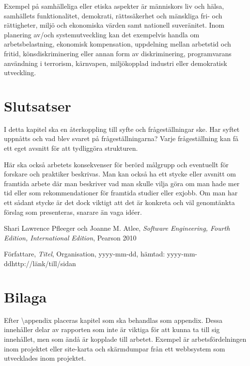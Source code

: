 \documentclass[a4paper,12pt,oneside,final]{extbook}
\begin{document}
Exempel på samhälleliga eller etiska aspekter är människors liv och
hälsa, samhällets funktionalitet, demokrati, rättssäkerhet och
mänskliga fri- och rättigheter, miljö och ekonomiska värden samt
nationell suveränitet. Inom planering av/och systemutveckling kan det
exempelvis handla om arbetsbelastning, ekonomisk kompensation,
uppdelning mellan arbetstid och fritid, könsdiskriminering eller annan
form av diskriminering, programvarans användning i terrorism,
kärnvapen, miljökopplad industri eller demokratisk utveckling.


\chapter{Slutsatser}

I detta kapitel ska en återkoppling till syfte och frågeställningar
ske. Har syftet uppnåtts och vad blev svaret på frågeställningarna?
Varje frågeställning kan få ett eget avsnitt för att tydliggöra
strukturen.

Här ska också arbetets konsekvenser för berörd målgrupp och eventuellt
för forskare och praktiker beskrivas. Man kan också ha ett stycke
eller avsnitt om framtida arbete där man beskriver vad man skulle
vilja göra om man hade mer tid eller som rekommendationer för framtida
studier eller exjobb. Om man har ett sådant stycke är det dock viktigt
att det är konkreta och väl genomtänkta förslag som presenteras,
snarare än vaga idéer.


\begin{thebibliography}{99}

  Shari Lawrence Pfleeger och Joanne M. Atlee, \emph{Software Engineering, Fourth Edition, International Edition}, Pearson 2010

 Författare, \emph{Titel}, Organisation, yyyy-mm-dd, hämtad: yyyy-mm-dd\newline http://länk/till/sidan

\end{thebibliography}


\appendix

\chapter{Bilaga}

Efter \textbackslash appendix placeras kapitel som ska behandlas som
appendix. Dessa innehåller delar av rapporten som inte är viktiga för
att kunna ta till sig innehållet, men som ändå är kopplade till
arbetet. Exempel är arbetsfördelningen inom projektet eller site-karta
och skärmdumpar från ett webbsystem som utvecklades inom projektet.
\end{document}
